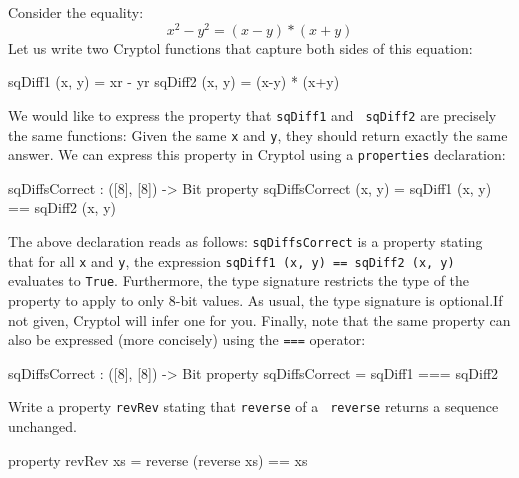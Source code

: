 Consider the equality:
$$
x^2 - y^2 = (x-y) * (x+y)
$$
Let us write two Cryptol functions that capture both sides of this
equation:\indTimes\indExponentiate\indMinus\indPlus
\begin{code}
  sqDiff1 (x, y) = x^^2  - y^^2
  sqDiff2 (x, y) = (x-y) * (x+y)
\end{code}
We would like to express the property that {\tt sqDiff1} and {\tt
  sqDiff2} are precisely the same functions: Given the same {\tt x}
and {\tt y}, they should return exactly the same answer. We can
express this property in Cryptol using a {\tt properties}
declaration:\indProperty
\begin{code}
  sqDiffsCorrect : ([8], [8]) -> Bit
  property sqDiffsCorrect (x, y) = sqDiff1 (x, y) == sqDiff2 (x, y)
\end{code}
The above declaration reads as follows: \texttt{sqDiffsCorrect} is a
property stating that for all \texttt{x} and \texttt{y}, the
expression \texttt{sqDiff1 (x, y) == sqDiff2 (x, y)} evaluates to
\texttt{True}. Furthermore, the type signature restricts the type of
the property to apply to only 8-bit values. As usual, the type
signature is optional.\indSignature If not given, Cryptol will infer
one for you. Finally, note that the same property can also be
expressed (more concisely) using the \texttt{===} operator:
\begin{code}
  sqDiffsCorrect : ([8], [8]) -> Bit
  property sqDiffsCorrect = sqDiff1 === sqDiff2
\end{code}


\begin{Exercise}\label{ex:thm:0}
  Write a property {\tt revRev} stating that {\tt reverse} of a {\tt
    reverse} returns a sequence unchanged.\indReverse
\end{Exercise}
\begin{Answer}\indReverse
\begin{code}
  property revRev xs = reverse (reverse xs) == xs
\end{code}
\end{Answer}

